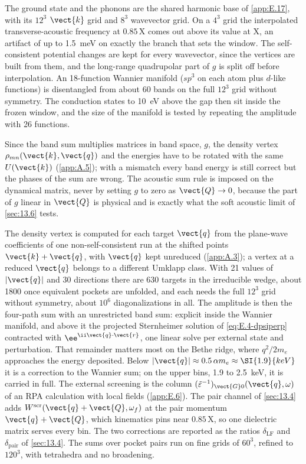 The ground state and the phonons are the shared harmonic base of \cref{app:E.17}, with its $12^3$ $\vect{k}$ grid and $8^3$ wavevector grid. On a $4^3$ grid the interpolated transverse-acoustic frequency at $0.85\,\mathrm{X}$ comes out above its value at X, an artifact of up to \SI{1.5}{meV} on exactly the branch that sets the window. The self-consistent potential changes are kept for every wavevector, since the vertices are built from them, and the long-range quadrupolar part of $g$ is split off before interpolation. An 18-function Wannier manifold ($sp^3$ on each atom plus $d$-like functions) is disentangled from about 60 bands on the full $12^3$ grid without symmetry. The conduction states to \SI{10}{eV} above the gap then sit inside the frozen window, and the size of the manifold is tested by repeating the amplitude with 26 functions.

Since the band sum multiplies matrices in band space, $g$, the density vertex $\rho_{mn}(\vect{k},\vect{q})$ and the energies have to be rotated with the same $U(\vect{k})$ (\cref{app:A.5}); with a mismatch every band energy is still correct but the phases of the sum are wrong. The acoustic sum rule is imposed on the dynamical matrix, never by setting $g$ to zero as $\vect{Q}\to0$, because the part of $g$ linear in $\vect{Q}$ is physical and is exactly what the soft acoustic limit of \cref{sec:13.6} tests.

The density vertex is computed for each target $\vect{q}$ from the plane-wave coefficients of one non-self-consistent run at the shifted points $\vect{k}+\vect{q}$, with $\vect{q}$ kept unreduced (\cref{app:A.3}); a vertex at a reduced $\vect{q}$ belongs to a different Umklapp class. With 21 values of $|\vect{q}|$ and 30 directions there are 630 targets in the irreducible wedge, about 1800 once equivalent pockets are unfolded, and each needs the full $12^3$ grid without symmetry, about $10^6$ diagonalizations in all. The amplitude is then the four-path sum with an unrestricted band sum: explicit inside the Wannier manifold, and above it the projected Sternheimer solution of \cref{eq:E.4-dpsiperp} contracted with $\ee^{\ii\vect{q}\cdot\vect{r}}$, one linear solve per external state and perturbation. That remainder matters most on the Bethe ridge, where $q^2/2m_e$ approaches the energy deposited. Below $|\vect{q}| \approx 0.5\,\alpha m_e \approx \SI{1.9}{keV}$ it is a correction to the Wannier sum; on the upper bins, 1.9 to \SI{2.5}{keV}, it is carried in full. The external screening is the column $(\tilde\varepsilon^{-1})_{\vect{G}0}(\vect{q},\omega)$ of an RPA calculation with local fields (\cref{app:E.6}). The pair channel of \cref{sec:13.4} adds $W^{\mathrm{scr}}(\vect{q}+\vect{Q},\omega_f)$ at the pair momentum $\vect{q}+\vect{Q}$, which kinematics pins near $0.85\,\mathrm{X}$, so one dielectric matrix serves every bin. The two corrections are reported as the ratios $\delta_{\mathrm{LF}}$ and $\delta_{\mathrm{pair}}$ of \cref{sec:13.4}. The sums over pocket pairs run on fine grids of $60^3$, refined to $120^3$, with tetrahedra and no broadening.

